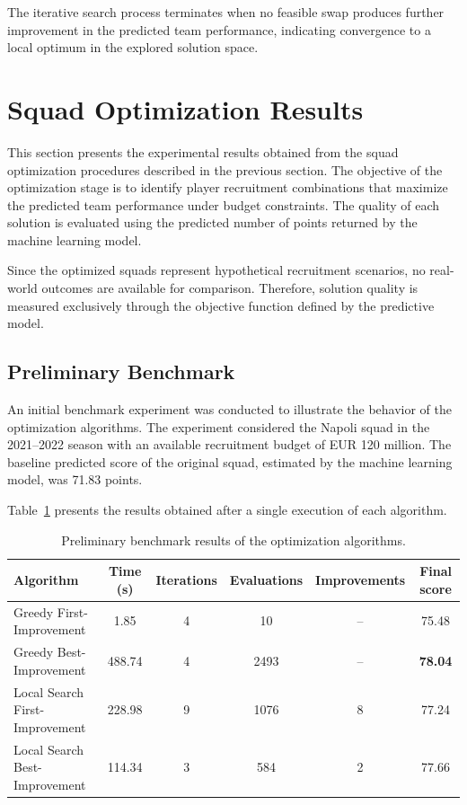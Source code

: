 \documentclass[a4paper,fleqn]{cas-sc}
\begin{document}
The iterative search process terminates when no feasible swap produces further improvement in the predicted team performance, indicating convergence to a local
optimum in the explored solution space.

\section{Squad Optimization Results}

This section presents the experimental results obtained from the squad optimization procedures described in the previous section. The objective
of the optimization stage is to identify player recruitment combinations that maximize the predicted team performance under budget constraints.
The quality of each solution is evaluated using the predicted number of points returned by the machine learning model.

Since the optimized squads represent hypothetical recruitment scenarios, no real-world outcomes are available for comparison. Therefore, solution
quality is measured exclusively through the objective function defined by the predictive model.

\subsection{Preliminary Benchmark}

An initial benchmark experiment was conducted to illustrate the behavior of the optimization algorithms. The experiment considered the Napoli
squad in the 2021--2022 season with an available recruitment budget of EUR 120 million. The baseline predicted score of the original squad, 
estimated by the machine learning model, was 71.83 points.

Table~\ref{tab:benchmark_inicial} presents the results obtained after a single execution of each algorithm.

\begin{table}[htbp]
\centering
\caption{Preliminary benchmark results of the optimization algorithms.}
\label{tab:benchmark_inicial}
\begin{tabular}{lccccc}
\toprule
Algorithm & Time (s) & Iterations & Evaluations & Improvements & Final score \\
\midrule
Greedy First-Improvement       & 1.85   & 4 & 10   & -- & 75.48 \\
Greedy Best-Improvement        & 488.74 & 4 & 2493 & -- & \textbf{78.04} \\
Local Search First-Improvement & 228.98 & 9 & 1076 & 8  & 77.24 \\
Local Search Best-Improvement  & 114.34 & 3 & 584  & 2  & 77.66 \\
\bottomrule
\end{tabular}
\end{table}
\end{document}
